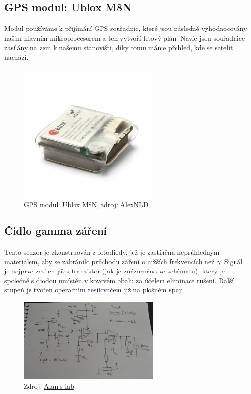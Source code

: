 \documentclass[a4paper]{report}
\begin{document}
\subsection{GPS modul: Ublox M8N}
\paragraph{} Modul používáme k přijímání GPS souřadnic, které jsou následně vyhodnocovány naším hlavním mikroprocesorem a ten vytvoří letový plán. Navíc jsou souřadnice zasílány na zem k našemu stanovišti, díky tomu máme přehled, kde se satelit nachází.
\begin{figure}[H]
\centering
\caption{GPS modul: Ublox M8N, zdroj: 
\href{https://alexnld.com/product/7m-8m-ublox-m8n-gps-module-for-apm-pixhawk-cc3d-naze32-f3-flight-control/}{AlexNLD}}
\includegraphics[width=200pt]{GPSmodul.jpg}
\end{figure}
\subsection{Čidlo gamma záření}
\paragraph{}Tento senzor je zkonstruován z fotodiody, jež je zastíněna neprůhledným materiálem, aby se zabránilo průchodu záření o nižších frekvencích než $\gamma$. Signál je nejprve zesílen přes tranzistor (jak je znázorněno ve schématu), který je společně s diodou umístěn v kovovém obalu za účelem eliminace rušení. Další stupeň je tvořen operačním zesilovačem již na plošném spoji.
\begin{figure}[H]
\centering
\caption{Zdroj:
\href{http://www.vk2zay.net/article/265}{Alan's lab}}
\includegraphics[width=200pt]{pd-gamma-counter-circuit.jpg}
\end{figure}
\end{document}
